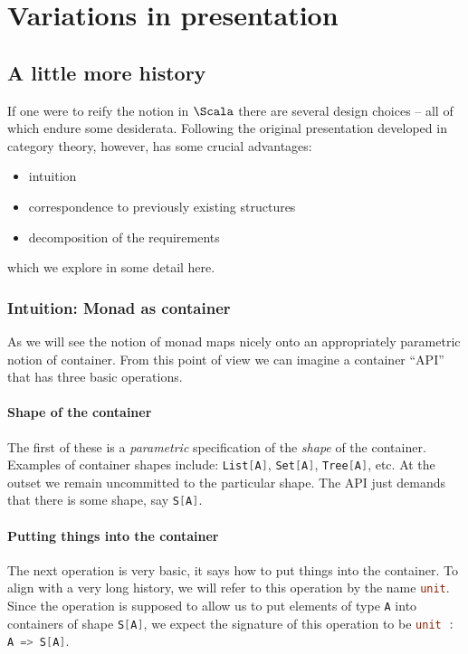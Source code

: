 \section{Variations in presentation}

\subsection{A little more history}

If one were to reify the notion in $\Scala$ there are several design
choices -- all of which endure some desiderata. Following the original
presentation developed in category theory, however, has some crucial
advantages:

\begin{itemize}
  \item intuition
  \item correspondence to previously existing structures
  \item decomposition of the requirements 
\end{itemize}

which we explore in some detail here.

\subsubsection{Intuition: Monad as container}

As we will see the notion of monad maps nicely onto an appropriately
parametric notion of container. From this point of view we can imagine
a container ``API'' that has three basic operations. 
\paragraph{Shape of the container} The first of these is a
\emph{parametric} specification of the \emph{shape} of the
container. Examples of container shapes include: \lstinline[language=Scala]!List[A]!,
\lstinline[language=Scala]!Set[A]!, \lstinline[language=Scala]!Tree[A]!, etc. At the outset we remain
uncommitted to the particular shape. The API just demands that
there is some shape, say \lstinline[language=Scala]!S[A]!.
\paragraph{Putting things into the container} The next operation is
very basic, it says how to put things into the container. To align
with a very long history, we will refer to this operation by the name
\lstinline[language=Scala]!unit!. Since the operation is supposed to allow us to put
elements of type \lstinline[language=Scala]!A! into containers of shape \lstinline[language=Scala]!S[A]!, we
expect the signature of this operation to be \lstinline[language=Scala]!unit : A => S[A]!.
